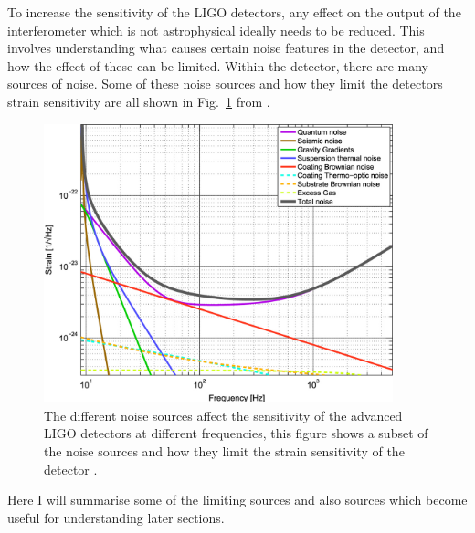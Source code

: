 To increase the sensitivity of the \gls{LIGO} detectors, any effect on the
output of the interferometer which is not astrophysical ideally needs to be
reduced.  This involves understanding what causes certain noise features in the
detector, and how the effect of
these can be limited.  Within the detector, there are many sources of noise.
Some of these noise sources and how they limit the detectors strain sensitivity
are all shown in Fig.~\ref{detectors:noisesensitivity} from
\citep{aasi2015AdvancedLIGO}.

\begin{figure}[h]
    \centering
    \includegraphics[width=0.9\textwidth]{C1_intro/noise_sensitivity.jpg}
    \caption[Example strain sensitivity curves for different noise sources in
\gls{LIGO}.]{The different noise sources affect the sensitivity of the
advanced \gls{LIGO} detectors at different frequencies, this figure shows a subset of the noise sources and how they limit the strain sensitivity of the detector \citep{aasi2015AdvancedLIGO}.}
\label{detectors:noisesensitivity} 
\end{figure}

Here I will summarise some of the limiting sources and also sources which
become useful for understanding later sections.

